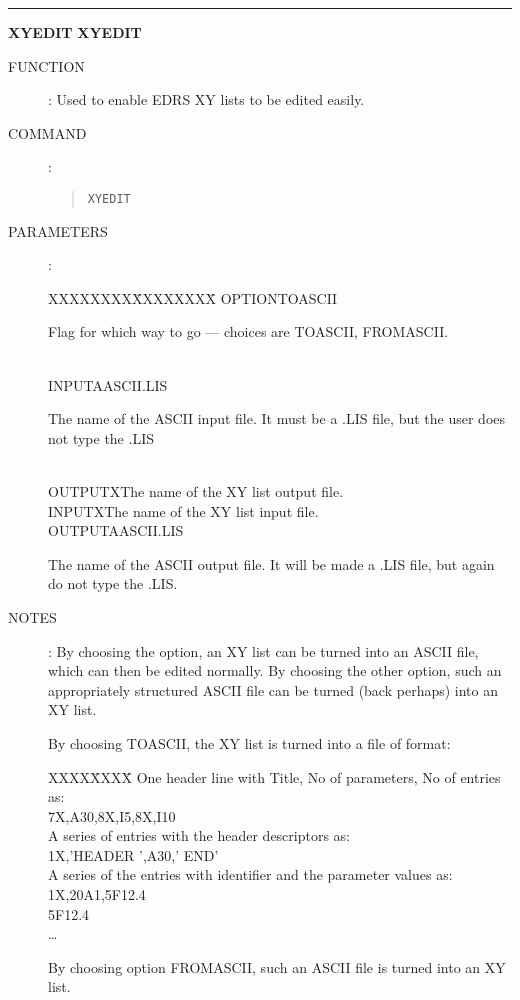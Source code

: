 \goodbreak
\rule{\textwidth}{0.3mm}
{\Large {\bf XYEDIT} \hfill {\bf XYEDIT}}
\begin{description}
\item [FUNCTION]:
Used to enable EDRS XY lists to be edited easily.
\item [COMMAND]:
\begin{quote}
{\tt XYEDIT}
\end{quote}
\item [PARAMETERS] :
\begin{tabbing}
XXXXXXXX\=XXXXXXXX\=\kill
OPTION\>TOASCII\>\begin{minipage}[t]{100mm}
Flag for which way to go --- choices are TOASCII, FROMASCII.
\end{minipage}\\
INPUTA\>ASCII.LIS\>\begin{minipage}[t]{100mm}
The name of the ASCII input file.
It must be a .LIS file, but the user does not type the .LIS
\end{minipage}\\
OUTPUTX\>\>The name of the XY list output file.\\
INPUTX\>\>The name of the XY list input file.\\
OUTPUTA\>ASCII.LIS\>\begin{minipage}[t]{100mm}
The name of the ASCII output file.
It will be made a .LIS file, but again do not type the .LIS.
\end{minipage}
\end{tabbing}
\item [NOTES]:
By choosing the option, an XY list can be turned into an ASCII file, which can
then be edited normally.
By choosing the other option, such an appropriately structured ASCII file can be
turned (back perhaps) into an XY list.

By choosing TOASCII, the XY list is turned into a file of format:
\begin{tabbing}
XXXX\=XXXX\=\kill
\>One header line with Title, No of parameters, No of entries as:\\
\>\>7X,A30,8X,I5,8X,I10\\
\>A series of entries with the header descriptors as:\\
\>\>1X,'HEADER ',A30,' END'\\
\>A series of the entries with identifier and the parameter values as:\\
\>\>1X,20A1,5F12.4\\
\>\>5F12.4\\
\>\>\ldots
\end{tabbing}
By choosing option FROMASCII, such an ASCII file is turned into an XY list.
\end{description}

